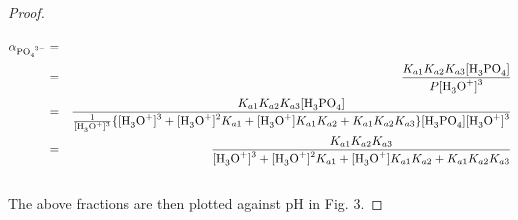 \documentclass[10pt,twoside,a4paper]{article}
\begin{document}
\begin{proof}
 	\begin{eqnarray}
 		\alpha_{\ce{PO4^{3-}}} & = & \frac{\ce{[PO4^{3-}]}}{P} \hspace{-10cm} \nonumber  \\
 		& = & \frac{K_{a1}K_{a2}K_{a3}\ce{[H3PO4]}}{P\ce{[H3O+]^3}} \nonumber \\
 		& = & \frac{K_{a1}K_{a2}K_{a3}\ce{[H3PO4]}}{\frac{1}{\ce{[H3O+]^3}} \{ \ce{[H3O+]^3} + \ce{[H3O+]^2}K_{a1} + \ce{[H3O+]}K_{a1}K_{a2} + K_{a1}K_{a2}K_{a3}\}\ce{[H3PO4][H3O+]^3}} \nonumber \\
 		& = & \frac{K_{a1}K_{a2}K_{a3}}{\ce{[H3O+]^3} + \ce{[H3O+]^2}K_{a1} + \ce{[H3O+]}K_{a1}K_{a2} + K_{a1}K_{a2}K_{a3}}
 		\end{eqnarray}
	\\[2\baselineskip]
	The above fractions are then plotted against pH in Fig. 3.



	\end{proof}
\end{document}
